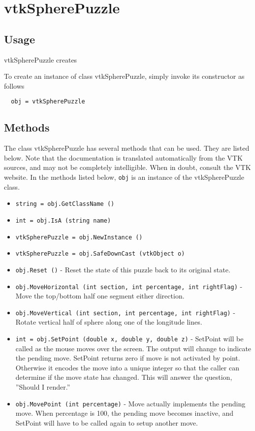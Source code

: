 \section{vtkSpherePuzzle}

\subsection{Usage}

 vtkSpherePuzzle creates 

To create an instance of class vtkSpherePuzzle, simply
invoke its constructor as follows
\begin{verbatim}
  obj = vtkSpherePuzzle
\end{verbatim}
\subsection{Methods}

The class vtkSpherePuzzle has several methods that can be used.
  They are listed below.
Note that the documentation is translated automatically from the VTK sources,
and may not be completely intelligible.  When in doubt, consult the VTK website.
In the methods listed below, \verb|obj| is an instance of the vtkSpherePuzzle class.
\begin{itemize}
\item  \verb|string = obj.GetClassName ()|

\item  \verb|int = obj.IsA (string name)|

\item  \verb|vtkSpherePuzzle = obj.NewInstance ()|

\item  \verb|vtkSpherePuzzle = obj.SafeDownCast (vtkObject o)|

\item  \verb|obj.Reset ()| -  Reset the state of this puzzle back to its original state.

\item  \verb|obj.MoveHorizontal (int section, int percentage, int rightFlag)| -  Move the top/bottom half one segment either direction.

\item  \verb|obj.MoveVertical (int section, int percentage, int rightFlag)| -  Rotate vertical half of sphere along one of the longitude lines.

\item  \verb|int = obj.SetPoint (double x, double y, double z)| -  SetPoint will be called as the mouse moves over the screen.
 The output will change to indicate the pending move.
 SetPoint returns zero if move is not activated by point.
 Otherwise it encodes the move into a unique integer so that
 the caller can determine if the move state has changed.
 This will answer the question, ''Should I render.''

\item  \verb|obj.MovePoint (int percentage)| -  Move actually implements the pending move. When percentage
 is 100, the pending move becomes inactive, and SetPoint
 will have to be called again to setup another move.

\end{itemize}
